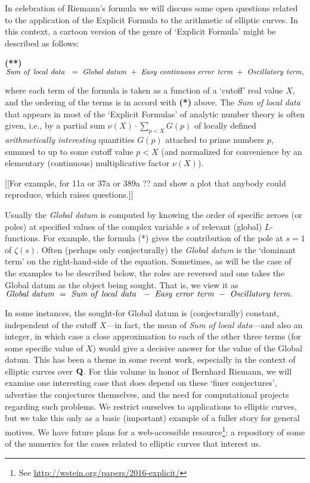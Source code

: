 \documentclass[11pt]{article}
\theoremstyle{plain}
\theoremstyle{definition}
\numberwithin{equation}{section}
\numberwithin{figure}{section}
\numberwithin{table}{section}
\def\Q{\bf{Q}}
\begin{document}
In celebration of Riemann's formula  we will discuss some open questions related to the application of the Explicit Formula to the arithmetic of elliptic curves. In this context, a cartoon version of the genre of `Explicit Formula' might be described as follows:

 {{\bf (**)} \ \  ${\rm{\it Sum\ of\ local\ data\  }}  \ = \  {\rm{\it Global\ datum}}\ +\  {\rm{\it  Easy\ continuous\ error\ term}}\ +\  {\rm{\it  Oscillatory\ term}},$ }


 \noindent where each  term of the formula  is taken as a function of a `cutoff' real value $X$, and the ordering of the terms is in accord with {\bf(*)} above.
  The {\it Sum of local data} that appears in most of the `Explicit Formulas' of analytic number theory is often given, i.e., by a partial sum $\nu(X)\cdot\sum_{p<X}G(p)$ of locally defined {\it arithmetically interesting} quantities $G(p)$ attached to prime numbers $p$, summed to up to some cutoff
value $p<X$  (and normalized for convenience by an elementary (continuous) multiplicative factor $\nu(X)$).

[[For example, for 11a or 37a or 389a ??  and show a plot that anybody could
reproduce, which raises questions.]]


   Usually the {\it Global datum} is computed by knowing the order of specific zeroes (or poles) at specified values of the complex variable $s$  of relevant (global) $L$-functions.  For example, the formula {(*)} gives the contribution of the pole at $s=1$ of $\zeta(s)$.  Often (perhaps only conjecturally)  the  {\it Global datum} is the `dominant term'    on the right-hand-side of the equation.  Sometimes, as will be the case  of the examples to be described below, the roles are reversed and one takes the Global datum as the object being sought.  That is, we view it as ${\rm{\it Global\ datum}}\ = \  {\rm{\it Sum\ of\ local\ data\  }}\ -\  {\rm{\it  Easy\ error\ term}}\ -\  {\rm{\it  Oscillatory\ term}}.$

   In some instances,  the sought-for Global datum is  (conjecturally) constant, independent of the cutoff $X$---in fact, the mean of {\it Sum of local data}---and also an integer, in which case a close approximation to each of the other three terms (for some specific value of $X$) would give a decisive answer for the value of the Global datum.   This has been a theme in some recent work, especially in the context of elliptic curves over ${\Q}$.
   For this volume in honor of Bernhard Riemann,  we will examine one interesting case  that does depend on these `finer conjectures',  advertise the conjectures themselves, and  the need for  computational projects regarding  such problems.  We restrict ourselves to applications to elliptic curves, but we take this only as a basic (important) example of a fuller story for general motives.  We have  future plans for a web-accessible resource\footnote{See \url{http://wstein.org/papers/2016-explicit/}}: a repository of some of the numerics for the cases related to elliptic curves that interest us.
\end{document}

